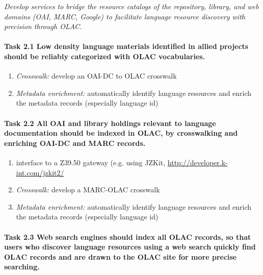 \emph{Develop services to bridge the resource catalogs of the
  repository, library, and web domains (OAI, MARC, Google)
  to facilitate language resource discovery with precision through OLAC.}

\def\task{2.1}
\paragraph{Task {\task} Low density language materials identified in allied projects
      should be reliably categorized with OLAC vocabularies.}

\begin{enumerate}[label=\emph{\task\alph*}]
\item \emph{Crosswalk:}
  develop an OAI-DC to OLAC crosswalk
\item \emph{Metadata enrichment:}
  automatically identify language resources and
  enrich the metadata records (especially language id)
\end{enumerate}

\def\task{2.2}
\paragraph{Task {\task} All OAI and library holdings relevant to language
      documentation should be indexed in OLAC, by
      crosswalking and enriching OAI-DC and MARC records.}

\begin{enumerate}[label=\emph{\task\alph*}]
\item interface to a Z39.50 gateway (e.g. using JZKit,
   \url{http://developer.k-int.com/jzkit2/}
\item \emph{Crosswalk:}
  develop a MARC-OLAC crosswalk
\item \emph{Metadata enrichment:}
  automatically identify language resources and
  enrich the metadata records (especially language id)
\end{enumerate}



\def\task{2.3}
\paragraph{Task {\task} Web search engines should index all OLAC records,
      so that users who discover language resources using a web search
      quickly find OLAC records and are drawn to the OLAC site for
      more precise searching.}

